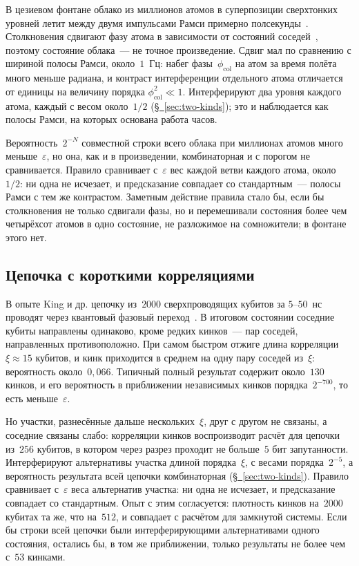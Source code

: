 \documentclass[11pt,a4paper]{article}
\begin{document}
В цезиевом фонтане облако из миллионов атомов в суперпозиции сверхтонких уровней летит между двумя импульсами Рамси примерно полсекунды~\cite{wynands2005}. Столкновения сдвигают фазу атома в зависимости от состояний соседей~\cite{gibble1993}, поэтому состояние облака~--- не точное произведение. Сдвиг мал по сравнению с шириной полосы Рамси, около~$1$~Гц: набег фазы~$\phi_{\mathrm{col}}$ на атом за время полёта много меньше радиана, и контраст интерференции отдельного атома отличается от единицы на величину порядка $\phi_{\mathrm{col}}^2\ll1$. Интерферируют два уровня каждого атома, каждый с весом около~$1/2$ (\hyperref[sec:two-kinds]{\S~\ref*{sec:two-kinds}}); это и наблюдается как полосы Рамси, на которых основана работа часов.

Вероятность~$2^{-N}$ совместной строки всего облака при миллионах атомов много меньше~$\varepsilon$, но она, как и в произведении, комбинаторная и с порогом не сравнивается. Правило сравнивает с~$\varepsilon$ вес каждой ветви каждого атома, около~$1/2$: ни одна не исчезает, и предсказание совпадает со стандартным~--- полосы Рамси с тем же контрастом. Заметным действие правила стало бы, если бы столкновения не только сдвигали фазы, но и перемешивали состояния более чем четырёхсот атомов в одно состояние, не разложимое на сомножители; в фонтане этого нет.

\subsection{Цепочка с короткими корреляциями}
\label{sec:chain}

В опыте King и др. цепочку из~$2000$ сверхпроводящих кубитов за $5$--$50$~нс проводят через квантовый фазовый переход~\cite{king2022}. В итоговом состоянии соседние кубиты направлены одинаково, кроме редких кинков~--- пар соседей, направленных противоположно. При самом быстром отжиге длина корреляции $\xi\approx15$ кубитов, и кинк приходится в среднем на одну пару соседей из~$\xi$: вероятность около~$0{,}066$. Типичный полный результат содержит около~$130$ кинков, и его вероятность в приближении независимых кинков порядка~$2^{-700}$, то есть меньше~$\varepsilon$.

Но участки, разнесённые дальше нескольких~$\xi$, друг с другом не связаны, а соседние связаны слабо: корреляции кинков воспроизводит расчёт для цепочки из~$256$ кубитов, в котором через разрез проходит не больше~$5$ бит запутанности. Интерферируют альтернативы участка длиной порядка~$\xi$, с весами порядка~$2^{-5}$, а вероятность результата всей цепочки комбинаторная (\hyperref[sec:two-kinds]{\S~\ref*{sec:two-kinds}}). Правило сравнивает с~$\varepsilon$ веса альтернатив участка: ни одна не исчезает, и предсказание совпадает со стандартным. Опыт с этим согласуется: плотность кинков на~$2000$ кубитах та же, что на~$512$, и совпадает с расчётом для замкнутой системы. Если бы строки всей цепочки были интерферирующими альтернативами одного состояния, остались бы, в том же приближении, только результаты не более чем с~$53$ кинками.
\end{document}
